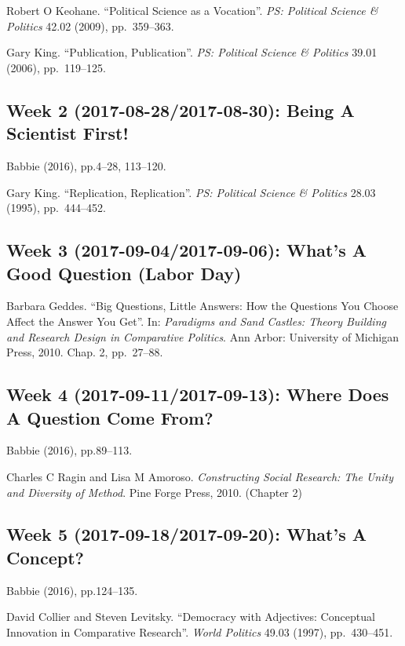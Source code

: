 \documentclass[11pt,]{article}
\theoremstyle{definition}
\theoremstyle{definition}
\theoremstyle{definition}
\theoremstyle{remark}
\begin{document}
Robert O Keohane. ``Political Science as a Vocation''.
\emph{PS: Political Science \& Politics} 42.02 (2009), pp.~359--363.

Gary King. ``Publication, Publication''.
\emph{PS: Political Science \& Politics} 39.01 (2006), pp.~119--125.

\subsection{Week 2 (2017-08-28/2017-08-30): Being A Scientist
First!}\label{week-2-2017-08-282017-08-30-being-a-scientist-first}

Babbie (2016), pp.4--28, 113--120.

Gary King. ``Replication, Replication''.
\emph{PS: Political Science \& Politics} 28.03 (1995), pp.~444--452.

\subsection{Week 3 (2017-09-04/2017-09-06): What's A Good Question
(Labor
Day)}\label{week-3-2017-09-042017-09-06-whats-a-good-question-labor-day}

Barbara Geddes. ``Big Questions, Little Answers: How the Questions You
Choose Affect the Answer You Get''. In:
\emph{Paradigms and Sand Castles: Theory Building and Research Design in Comparative Politics}.
Ann Arbor: University of Michigan Press, 2010. Chap. 2, pp.~27--88.

\subsection{Week 4 (2017-09-11/2017-09-13): Where Does A Question Come
From?}\label{week-4-2017-09-112017-09-13-where-does-a-question-come-from}

Babbie (2016), pp.89--113.

Charles C Ragin and Lisa M Amoroso.
\emph{Constructing Social Research: The Unity and Diversity of Method}.
Pine Forge Press, 2010. (Chapter 2)

\subsection{Week 5 (2017-09-18/2017-09-20): What's A
Concept?}\label{week-5-2017-09-182017-09-20-whats-a-concept}

Babbie (2016), pp.124--135.

David Collier and Steven Levitsky. ``Democracy with Adjectives:
Conceptual Innovation in Comparative Research''. \emph{World Politics}
49.03 (1997), pp.~430--451.
\end{document}
